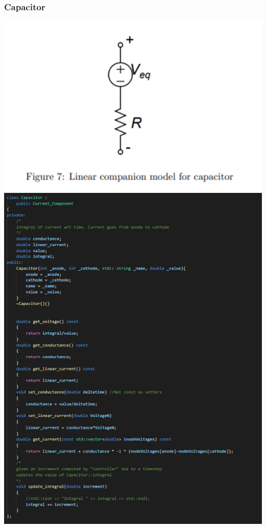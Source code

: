 \documentclass{article}
\begin{document}
\subsubsection{Capacitor}
\includegraphics[width=15cm]{images/CapLinModel.PNG}
\newpage
\includegraphics[width=15cm]{images/Capacitor.PNG}
\end{document}
